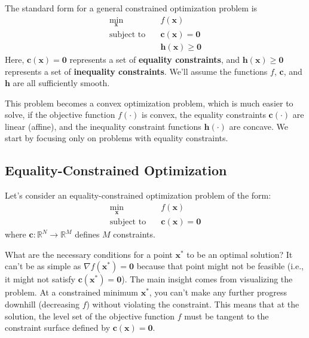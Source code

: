 The standard form for a general constrained optimization problem is
\begin{equation}
\begin{aligned}
\min_{\mathbf{x}} \quad & f(\mathbf{x}) \\
\text{subject to} \quad & \mathbf{c}(\mathbf{x}) = \mathbf{0} \\
& \mathbf{h}(\mathbf{x}) \ge \mathbf{0}
\end{aligned}
\end{equation}
Here, $\mathbf{c}(\mathbf{x}) = \mathbf{0}$ represents a set of \textbf{equality constraints}, and $\mathbf{h}(\mathbf{x}) \ge \mathbf{0}$ represents a set of \textbf{inequality constraints}. We'll assume the functions $f$, $\mathbf{c}$, and $\mathbf{h}$ are all sufficiently smooth. 

This problem becomes a convex optimization problem, which is much easier to solve, if the objective function $f(\cdot)$ is convex, the equality constraints $\mathbf{c}(\cdot)$ are linear (affine), and the inequality constraint functions $\mathbf{h}(\cdot)$ are concave. We start by focusing only on problems with equality constraints.

\subsection{Equality-Constrained Optimization}

Let's consider an equality-constrained optimization problem of the form:
\begin{equation}
\begin{aligned}
    \min_{\mathbf{x}} \quad & f(\mathbf{x}) \\
    \text{subject to} \quad & \mathbf{c}(\mathbf{x}) = \mathbf{0}
    \end{aligned}
\end{equation}
where $\mathbf{c}: \mathbb{R}^N \to \mathbb{R}^M$ defines $M$ constraints.

What are the necessary conditions for a point $\mathbf{x}^*$ to be an optimal solution? It can't be as simple as $\nabla f(\mathbf{x}^*) = \mathbf{0}$ because that point might not be feasible (i.e., it might not satisfy $\mathbf{c}(\mathbf{x}^*) = \mathbf{0}$). The main insight comes from visualizing the problem. At a constrained minimum $\mathbf{x}^*$, you can't make any further progress downhill (decreasing $f$) without violating the constraint. This means that at the solution, the level set of the objective function $f$ must be tangent to the constraint surface defined by $\mathbf{c}(\mathbf{x}) = \mathbf{0}$.

